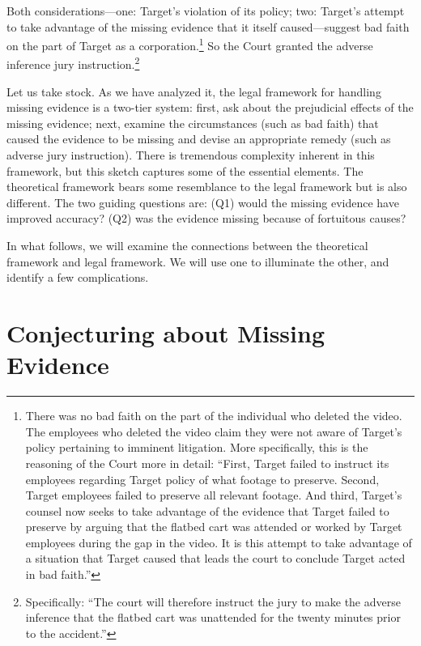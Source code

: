 \documentclass[
  10pt,
  dvipsnames,enabledeprecatedfontcommands]{scrartcl}
\begin{document}
\noindent Both considerations---one: Target's violation of its policy;
two: Target's attempt to take advantage of the missing evidence that it
itself caused---suggest bad faith on the part of Target as a
corporation.\footnote{There was no bad faith on the part of the
  individual who deleted the video. The employees who deleted the video
  claim they were not aware of Target's policy pertaining to imminent
  litigation. More specifically, this is the reasoning of the Court more
  in detail: ``First, Target failed to instruct its employees regarding
  Target policy of what footage to preserve. Second, Target employees
  failed to preserve all relevant footage. And third, Target's counsel
  now seeks to take advantage of the evidence that Target failed to
  preserve by arguing that the flatbed cart was attended or worked by
  Target employees during the gap in the video. It is this attempt to
  take advantage of a situation that Target caused that leads the court
  to conclude Target acted in bad faith.''} So the Court granted the
adverse inference jury instruction.\footnote{ Specifically: ``The court
  will therefore instruct the jury to make the adverse inference that
  the flatbed cart was unattended for the twenty minutes prior to the
  accident.''}

\vspace{4mm}

\noindent Let us take stock. As we have analyzed it, the legal framework
for handling missing evidence is a two-tier system: first, ask about the
prejudicial effects of the missing evidence; next, examine the
circumstances (such as bad faith) that caused the evidence to be missing
and devise an appropriate remedy (such as adverse jury instruction).
There is tremendous complexity inherent in this framework, but this
sketch captures some of the essential elements. The theoretical
framework bears some resemblance to the legal framework but is also
different. The two guiding questions are: (Q1) would the missing
evidence have improved accuracy? (Q2) was the evidence missing because
of fortuitous causes?

In what follows, we will examine the connections between the theoretical
framework and legal framework. We will use one to illuminate the other,
and identify a few complications.

\hypertarget{conjecturing-about-missing-evidence}{%
\section{Conjecturing about Missing
Evidence}\label{conjecturing-about-missing-evidence}}
\end{document}
